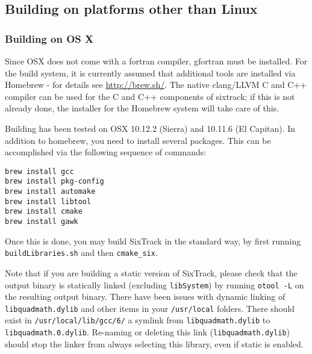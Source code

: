 \documentclass[english,BCOR=0mm,DIV=18]{scrartcl}
\begin{document}
\subsection{Building on platforms other than Linux}

\subsubsection{Building on OS X}

Since OSX does not come with a fortran compiler, gfortran must be installed.
For the build system, it is currently assumed that additional tools are installed via Homebrew - for details see \url{http://brew.sh/}.
The native clang/LLVM C and C++ compiler can be used for the C and C++ components of sixtrack; if this is not already done, the installer for the Homebrew system will take care of this.

Building has been tested on OSX 10.12.2 (Sierra) and 10.11.6 (El Capitan).
In addition to homebrew, you need to install several packages.
This can be accomplished via the following sequence of commands:
\begin{lstlisting}
brew install gcc
brew install pkg-config
brew install automake
brew install libtool
brew install cmake
brew install gawk
\end{lstlisting}
Once this is done, you may build SixTrack in the standard way, by first running \texttt{buildLibraries.sh} and then \texttt{cmake\_six}.


Note that if you are building a static version of SixTrack, please check that the output binary is statically linked (excluding \texttt{libSystem}) by running \texttt{otool -L} on the resulting output binary.
There have been issues with dynamic linking of \texttt{libquadmath.dylib} and other items in your \texttt{/usr/local} folders.
There should exist in \texttt{/usr/local/lib/gcc/6/} a symlink from \texttt{libquadmath.dylib} to \texttt{libquadmath.0.dylib}.
Re-naming or deleting this link (\texttt{libquadmath.dylib}) should stop the linker from always selecting this library, even if static is enabled.
\end{document}
